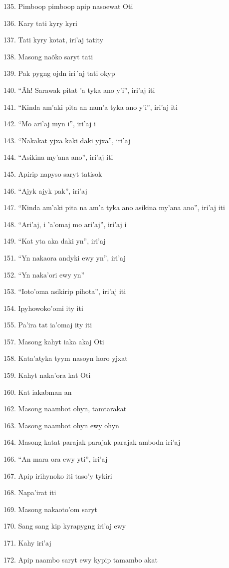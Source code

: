 135. Pimboop pimboop apip nasoewat Oti

136. Kary tati kyry kyri

137. Tati kyry kotat, iri'aj tatity

138. Masong naõko saryt tati

139. Pak pygng ojdn iri´aj tati okyp

140. ``Ãh! Sarawak pitat 'a tyka ano y'i'', iri'aj iti

141. ``Kinda am'aki pita an nam'a tyka ano y'i'', iri'aj iti

142. ``Mo ari'aj myn i'', iri'aj i

143. ``Nakakat yjxa kaki daki yjxa'', iri'aj

144. ``Asikina my'ana ano'', iri'aj iti

145. Apirip napyso saryt tatisok

146. ``Ajyk ajyk pak'', iri'aj

147. ``Kinda am'aki pita na am'a tyka ano asikina my'ana ano'', iri'aj iti

148. ``Ari'aj, i 'a'omaj mo ari'aj'', iri'aj i

149. ``Kat yta aka daki yn'', iri'aj

151. ``Yn nakaora andyki ewy yn'', iri'aj

152. ``Yn naka'ori ewy yn''

153. ``Ioto'oma asikirip pihota'', iri'aj iti

154. Ipyhowoko'omi ity iti

155. Pa'ira tat ia'omaj ity iti

157. Masong kahyt iaka akaj Oti

158. Kata'atyka tyym nasoyn horo yjxat

159. Kahyt naka'ora kat Oti

160. Kat iakabman an

162. Masong naambot ohyn, tamtarakat

163. Masong naambot ohyn ewy ohyn

164. Masong katat parajak parajak parajak ambodn iri'aj

166. ``An mara ora ewy yti'', iri'aj

167. Apip irihynoko iti taso'y tykiri

168. Napa'irat iti

169. Masong nakaoto'om saryt

170. Sang sang kip kyrapygng iri'aj ewy

171. Kahy iri'aj

172. Apip naambo saryt ewy kypip tamambo akat

